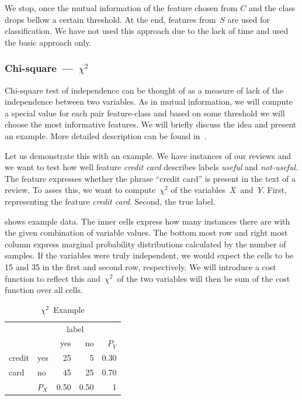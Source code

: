 We stop, once the mutual information of the feature chosen from $C$ and the class drops bellow a certain
threshold.
At the end, features from~$S$ are used for classification.
We have not used this approach due to the lack of time and used the basic approach only.


\subsubsection{Chi-square~---~$\chi^2$}

Chi-square test of independence can be thought of
as a measure of lack of the independence between two variables.
As in mutual information,
we will compute a special value for each pair feature-class
and based on some threshold we will choose the most informative features.
We will briefly discuss the idea and present an example.
More detailed description can be found in~\citet{Hugh13}.


Let us demonstrate this with an example.
We have instances of our reviews and we want to test how well
feature \textit{credit card} describes
labels \textit{useful} and \textit{not-useful}.
The feature expresses whether the phrase ``credit card'' is present in the text of a review.
To asses this, we want to compute~$\chi^2$ of the variables~$X$~and~$Y$.
First, representing the feature \textit{credit card}.
Second, the true label.

 shows example data.
The inner cells express how many instances there are with the given combination of variable values.
The bottom most row and right most column express marginal probability distributions
calculated by the number of samples.
If the variables were truly independent,
we would expect the cells to be 15 and 35 in the first and second row, respectively.
We will introduce a cost function to reflect this
and~$\chi^2$~of the two variables will then be sum of the cost function over all cells.


\begin{table}[h!]
 \center
 \begin{tabular}{ll|r|r|r}
 \cline{3-4}
        &       & \multicolumn{2}{c|}{label} & \\
        \cline{3-4}
        &       & yes        & no            & $P_Y$ \\
        \cline{1-4}
	 \multicolumn{1}{|l|}{credit} & yes   & 25         & 5             & 0.30 \\
        \cline{2-4}
	 \multicolumn{1}{|l|}{card}   & no    & 45         & 25            & 0.70 \\
        \cline{1-4}
		& \multicolumn{1}{l}{$P_X$} & \multicolumn{1}{l}{0.50}       & \multicolumn{1}{l}{0.50}          & 1
 
 \end{tabular}
 \caption{$\chi^2$~Example}
 \label{tab:chi_ex}
\end{table}

